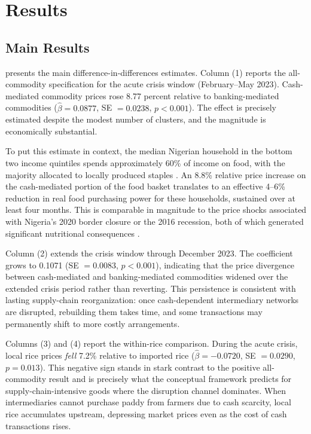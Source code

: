\documentclass[12pt]{article}
\begin{document}
\section{Results}
\label{sec:results}

\subsection{Main Results}

 presents the main difference-in-differences estimates. Column (1) reports the all-commodity specification for the acute crisis window (February--May 2023). Cash-mediated commodity prices rose 8.77 percent relative to banking-mediated commodities ($\hat{\beta} = 0.0877$, SE $= 0.0238$, $p < 0.001$). The effect is precisely estimated despite the modest number of clusters, and the magnitude is economically substantial.

To put this estimate in context, the median Nigerian household in the bottom two income quintiles spends approximately 60\% of income on food, with the majority allocated to locally produced staples \citep{nbs2020}. An 8.8\% relative price increase on the cash-mediated portion of the food basket translates to an effective 4--6\% reduction in real food purchasing power for these households, sustained over at least four months. This is comparable in magnitude to the price shocks associated with Nigeria's 2020 border closure or the 2016 recession, both of which generated significant nutritional consequences \citep{aker2017, fao2023nigeria}.

Column (2) extends the crisis window through December 2023. The coefficient grows to 0.1071 (SE $= 0.0083$, $p < 0.001$), indicating that the price divergence between cash-mediated and banking-mediated commodities widened over the extended crisis period rather than reverting. This persistence is consistent with lasting supply-chain reorganization: once cash-dependent intermediary networks are disrupted, rebuilding them takes time, and some transactions may permanently shift to more costly arrangements.



Columns (3) and (4) report the within-rice comparison. During the acute crisis, local rice prices \emph{fell} 7.2\% relative to imported rice ($\hat{\beta} = -0.0720$, SE $= 0.0290$, $p = 0.013$). This negative sign stands in stark contrast to the positive all-commodity result and is precisely what the conceptual framework predicts for supply-chain-intensive goods where the disruption channel dominates. When intermediaries cannot purchase paddy from farmers due to cash scarcity, local rice accumulates upstream, depressing market prices even as the cost of cash transactions rises.
\end{document}
